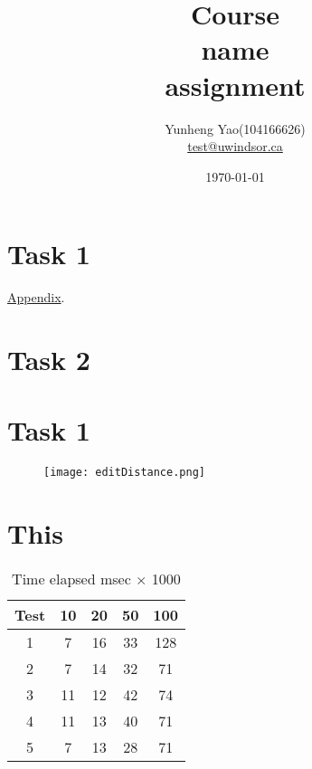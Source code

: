 \documentclass[12pt]{article}
\title{ Course\\ name \\ assignment}
\author
{
	Yunheng Yao(104166626)\\
	\href{mailto:test@uwindsor.ca}{test@uwindsor.ca}
}
\date{\today}
\begin{document}
\maketitle
\thispagestyle{empty}
\section*{Task 1}
\hyperref[figure:1]{Appendix}.
\section*{Task 2}
\newpage
\appendix
\section{Task 1}
\begin{figure}[H]
\label{figure:1}
\texttt{[image: editDistance.png]}
\end{figure}
\section{This}
\begin{figure}[H]
\label{diagram:1}

\end{figure}
\begin{table}[H]
	\centering
	\label{table:1}
	\begin{tabular}{|c|c|c|c|c|}
		\hline
		Test&10&20&50&100\\
		\hline
		1&7&16&33&128\\
		2&7&14&32&71\\
		3&11&12&42&74\\
		4&11&13&40&71\\
		5&7&13&28&71\\
		\hline
	\end{tabular}
	\caption{Time elapsed msec $\times$ 1000}
\end{table}
\newpage

\end{document}
